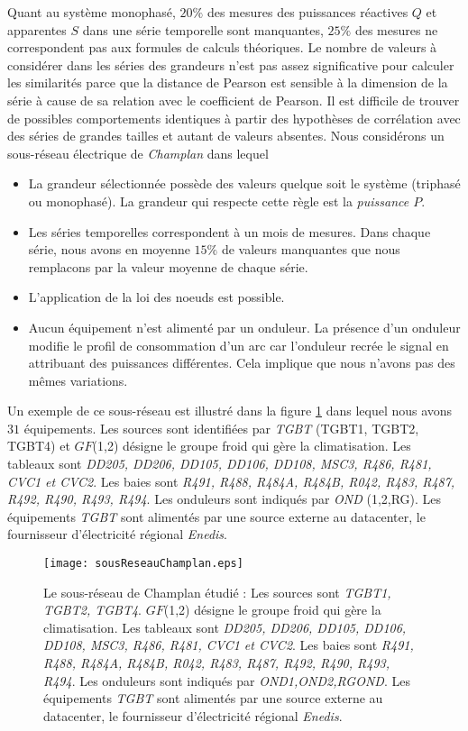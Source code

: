 Quant au syst\`eme monophas\'e, $20\%$ des mesures des puissances r\'eactives $Q$ et apparentes $S$ dans une s\'erie temporelle sont manquantes, $25\%$ des mesures ne correspondent pas aux formules de calculs th\'eoriques. 
Le nombre de valeurs \`a consid\'erer dans les s\'eries des grandeurs n'est pas assez significative pour calculer les similarit\'es parce que la distance de Pearson est sensible \`a la dimension de la s\'erie \`a cause de sa relation avec le coefficient de Pearson. Il est difficile de trouver de possibles comportements identiques \`a partir des hypoth\`eses de corr\'elation avec des s\'eries de grandes tailles et autant de valeurs absentes.
\newline
Nous consid\'erons un sous-r\'eseau \'electrique de {\em Champlan} dans lequel 
\begin{itemize}
	\item La grandeur s\'electionn\'ee poss\`ede des valeurs quelque soit le syst\`eme (triphas\'e ou monophas\'e). La grandeur qui respecte cette r\`egle est la {\em puissance $P$}.
	\item Les s\'eries temporelles correspondent \`a un mois de mesures. 
		Dans chaque s\'erie, nous avons en moyenne $15\%$ de valeurs manquantes que nous remplacons par la valeur moyenne de chaque s\'erie.
	\item L'application de la loi des noeuds est possible.
	\item Aucun \'equipement n'est aliment\'e par un onduleur. La pr\'esence d'un onduleur modifie le profil de consommation d'un arc car l'onduleur recr\'ee le signal en attribuant des puissances diff\'erentes. Cela implique que nous n'avons pas des m\^emes variations.
	 
\end{itemize}
Un exemple de ce sous-r\'eseau est illustr\'e dans la figure \ref{sousReseauChamplan} dans lequel nous avons $31$ \'equipements. Les sources sont identifi\'ees par {\em TGBT} (TGBT1, TGBT2, TGBT4) et $GF$(1,2) d\'esigne le groupe froid qui g\`ere la climatisation. Les tableaux sont {\em DD205, DD206, DD105, DD106, DD108, MSC3, R486, R481, CVC1 et CVC2}. Les baies sont {\em R491, R488, R484A, R484B, R042, R483, R487, R492, R490, R493, R494}. Les onduleurs sont indiqu\'es par {\em OND} (1,2,RG). Les \'equipements {\em TGBT} sont aliment\'es par une source externe au datacenter, le fournisseur d'\'electricit\'e r\'egional {\em Enedis}.  
\begin{figure}[htb!] 
\centering
\texttt{[image: sousReseauChamplan.eps]}
\caption{Le sous-r\'eseau de Champlan \'etudi\'e : Les sources sont {\em TGBT1, TGBT2, TGBT4}. $GF$(1,2) d\'esigne le groupe froid qui g\`ere la climatisation. 
Les tableaux sont {\em DD205, DD206, DD105, DD106, DD108, MSC3, R486, R481, CVC1 et CVC2}. 
Les baies sont {\em R491, R488, R484A, R484B, R042, R483, R487, R492, R490, R493, R494}. Les onduleurs sont indiqu\'es par {\em OND1,OND2,RGOND}. 
Les \'equipements {\em TGBT} sont aliment\'es par une source externe au datacenter, le fournisseur d'\'electricit\'e r\'egional {\em Enedis}.
}
\label{sousReseauChamplan}
\end{figure}
